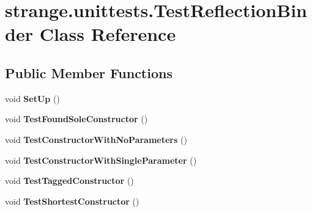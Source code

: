 \hypertarget{classstrange_1_1unittests_1_1_test_reflection_binder}{\section{strange.\-unittests.\-Test\-Reflection\-Binder Class Reference}
\label{classstrange_1_1unittests_1_1_test_reflection_binder}
}
\subsection*{Public Member Functions}
\begin{DoxyCompactItemize}
\item 
\hypertarget{classstrange_1_1unittests_1_1_test_reflection_binder_a316dfba2bbc6fb7f47de2add23000826}{void {\bfseries Set\-Up} ()}\label{classstrange_1_1unittests_1_1_test_reflection_binder_a316dfba2bbc6fb7f47de2add23000826}

\item 
\hypertarget{classstrange_1_1unittests_1_1_test_reflection_binder_ab0726160cfa56d571aac69cdc99d2947}{void {\bfseries Test\-Found\-Sole\-Constructor} ()}\label{classstrange_1_1unittests_1_1_test_reflection_binder_ab0726160cfa56d571aac69cdc99d2947}

\item 
\hypertarget{classstrange_1_1unittests_1_1_test_reflection_binder_a55a6173dd62fa2bbf4ae1d3d44db4286}{void {\bfseries Test\-Constructor\-With\-No\-Parameters} ()}\label{classstrange_1_1unittests_1_1_test_reflection_binder_a55a6173dd62fa2bbf4ae1d3d44db4286}

\item 
\hypertarget{classstrange_1_1unittests_1_1_test_reflection_binder_a5af2c4ef31c970573e52ccda7d7309b5}{void {\bfseries Test\-Constructor\-With\-Single\-Parameter} ()}\label{classstrange_1_1unittests_1_1_test_reflection_binder_a5af2c4ef31c970573e52ccda7d7309b5}

\item 
\hypertarget{classstrange_1_1unittests_1_1_test_reflection_binder_a5749ff9893f510acd429878d0bca6c30}{void {\bfseries Test\-Tagged\-Constructor} ()}\label{classstrange_1_1unittests_1_1_test_reflection_binder_a5749ff9893f510acd429878d0bca6c30}

\item 
\hypertarget{classstrange_1_1unittests_1_1_test_reflection_binder_a1d81ca72481d95759fc2b1f3840b19a2}{void {\bfseries Test\-Shortest\-Constructor} ()}\label{classstrange_1_1unittests_1_1_test_reflection_binder_a1d81ca72481d95759fc2b1f3840b19a2}


\end{DoxyCompactItemize}
